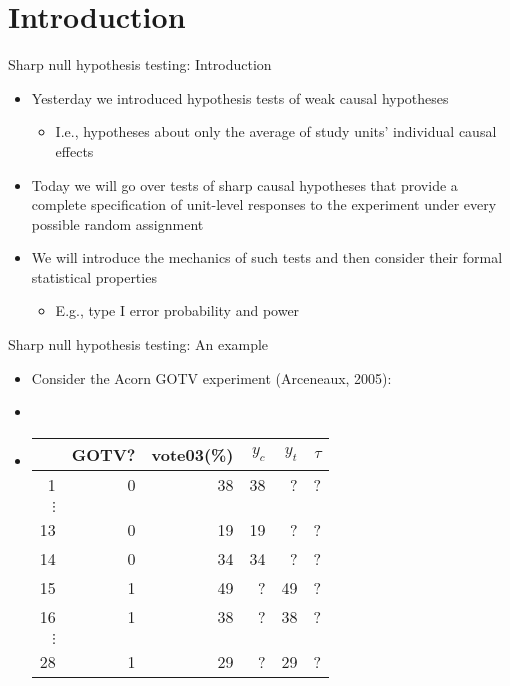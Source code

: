 \documentclass[table, xcolor={dvipsnames}, 9pt]{beamer}
\theoremstyle{newstyle}
\begin{document}
\section{Introduction}
\begin{frame}{Sharp null hypothesis testing: Introduction}
\begin{itemize}
\item Yesterday we introduced hypothesis tests of weak causal hypotheses \pause 
\begin{itemize}
\item I.e., hypotheses about only the average of study units' individual causal effects \pause 
\end{itemize}
\item Today we will go over tests of sharp causal hypotheses that provide a complete specification of unit-level responses to the experiment under every possible random assignment \pause 
\item We will introduce the mechanics of such tests and then consider their formal statistical properties \pause 
\begin{itemize}
\item E.g., type I error probability and power 
\end{itemize}  
\end{itemize}
\end{frame}
\begin{frame}{Sharp null hypothesis testing: An example}
\begin{itemize}
\item Consider the Acorn GOTV experiment (Arceneaux, 2005): \pause 
\item[]
\item[]
\begin{center}
  \begin{tabular}{r|rr|rrr}
  \hline
 & GOTV? & vote03(\%)& $y_c$ & $y_t$ & $\tau$\\
  \hline
1 & 0 & 38 & 38 & ? & ?\\
$\vdots$& & & & & \\
13 & 0 & 19 & 19& ? & ?\\
14 & 0 & 34 & 34& ? & ?\\
15 & 1 & 49 & ?& 49 & ?\\
16 & 1 & 38 & ?& 38 & ?\\
$\vdots$& & & & & \\
28 & 1 & 29 & ?& 29 & ? \\
   \hline
\end{tabular}
\end{center}
\end{itemize}  
\end{frame}
\end{document}
